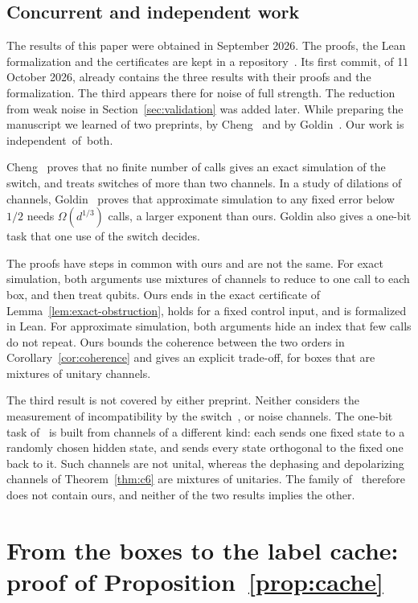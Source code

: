 \documentclass[11pt,letterpaper]{article}
\theoremstyle{definition}\newtheorem{definition}[theorem]{Definition}
\begin{document}
\subsection{Concurrent and independent work}\label{sec:concurrent}

The results of this paper were obtained in September 2026. The proofs,
the Lean formalization and the certificates are kept in a
repository~\cite{repo}. Its first commit, of 11 October 2026, already
contains the three results with their proofs and the formalization. The
third appears there for noise of full strength. The reduction from
weak noise in Section~\ref{sec:validation} was added later.
While preparing the manuscript we learned of two preprints, by
Cheng~\cite{cheng2026} and by Goldin~\cite{goldin2026}. Our work is \mbox{independent of both.}

Cheng~\cite{cheng2026} proves that no finite number of calls gives an
exact simulation of the switch, and treats switches of more than two
channels. In a study of dilations of channels,
Goldin~\cite{goldin2026} proves that approximate simulation to any
fixed error below $1/2$ needs $\Omega(d^{1/3})$ calls, a larger
exponent than ours. Goldin also gives a one-bit task that one use of the
switch decides.

The proofs have steps in common with ours and are not the same. For
exact simulation, both arguments use mixtures of channels to reduce to
one call to each box, and then treat qubits. Ours ends in the exact
certificate of Lemma~\ref{lem:exact-obstruction}, holds for a fixed
control input, and is formalized in Lean. For approximate simulation,
both arguments hide an index that few calls do not repeat. Ours bounds
the coherence between the two orders in
Corollary~\ref{cor:coherence} and gives an explicit trade-off, for
boxes that are mixtures of unitary channels.

The third result is not covered by either preprint. Neither considers
the measurement of incompatibility by the switch~\cite{gao2023}, or
noise channels. The one-bit task
of~\cite{goldin2026} is built from channels of a different kind: each
sends one fixed state to a randomly chosen hidden state, and sends
every state orthogonal to the fixed one back to it. Such channels are not
unital, whereas the dephasing and depolarizing channels of
Theorem~\ref{thm:c6} are mixtures of unitaries. The family
of~\cite{goldin2026} therefore does not contain ours, and neither of
the two results implies the other.
\appendix
\section{From the boxes to the label cache: proof of Proposition~\ref{prop:cache}}\label{sec:c6-recording}
\end{document}
